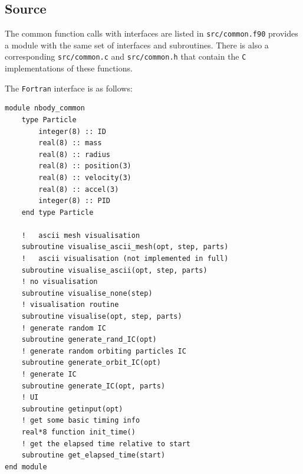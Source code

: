 \subsection{Source}
The common function calls with interfaces are listed in \texttt{src/common.f90} provides a module with the same set of interfaces and subroutines. There is also a corresponding \texttt{src/common.c} and  \texttt{src/common.h} that contain the \texttt{C} implementations of these functions. 

The \texttt{Fortran} interface is as follows:
\begin{center}
\begin{minipage}{0.95\textwidth}
\small
\begin{verbatim}
module nbody_common
    type Particle
        integer(8) :: ID
        real(8) :: mass
        real(8) :: radius
        real(8) :: position(3)
        real(8) :: velocity(3)
        real(8) :: accel(3)
        integer(8) :: PID
    end type Particle

    !   ascii mesh visualisation
    subroutine visualise_ascii_mesh(opt, step, parts)
    !   ascii visualisation (not implemented in full)
    subroutine visualise_ascii(opt, step, parts)
    ! no visualisation
    subroutine visualise_none(step)
    ! visualisation routine
    subroutine visualise(opt, step, parts)
    ! generate random IC
    subroutine generate_rand_IC(opt)
    ! generate random orbiting particles IC
    subroutine generate_orbit_IC(opt)
    ! generate IC
    subroutine generate_IC(opt, parts)
    ! UI
    subroutine getinput(opt)
    ! get some basic timing info
    real*8 function init_time()
    ! get the elapsed time relative to start
    subroutine get_elapsed_time(start)
end module
\end{verbatim}
\end{minipage}
\end{center}

